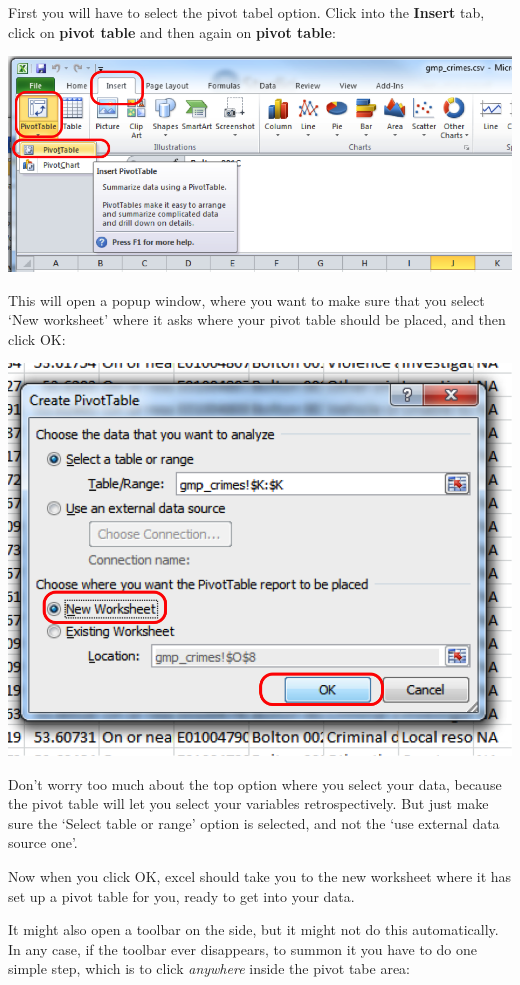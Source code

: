 \documentclass[]{book}
\theoremstyle{definition}
\theoremstyle{definition}
\theoremstyle{definition}
\theoremstyle{remark}
\begin{document}
First you will have to select the pivot tabel option. Click into the
\textbf{Insert} tab, click on \textbf{pivot table} and then again on
\textbf{pivot table}:

\includegraphics{imgs/click_pivot.png}

This will open a popup window, where you want to make sure that you
select `New worksheet' where it asks where your pivot table should be
placed, and then click OK:

\includegraphics{imgs/pivot_popup.png}

Don't worry too much about the top option where you select your data,
because the pivot table will let you select your variables
retrospectively. But just make sure the `Select table or range' option
is selected, and not the `use external data source one'.

Now when you click OK, excel should take you to the new worksheet where
it has set up a pivot table for you, ready to get into your data.

It might also open a toolbar on the side, but it might not do this
automatically. In any case, if the toolbar ever disappears, to summon it
you have to do one simple step, which is to click \emph{anywhere} inside
the pivot tabe area:
\end{document}
